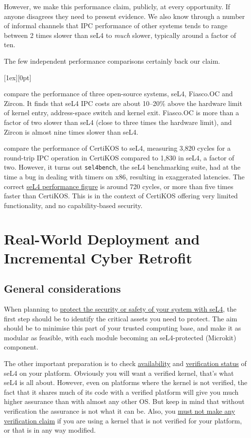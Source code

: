 \documentclass[english,a4paper,12pt]{report}
\newcommand{\Sect}[1]{\section{#1}}
\newcommand{\SSect}[1]{\subsection{#1}}
\newcommand{\Sect}[1]{\chapter{#1}}
\newcommand{\SSect}[1]{\section{#1}}
\newcommand{\code}[1]{\texttt{#1}}
\newlength{\chillilng}\setlength{\chillilng}{8mm}
\newlength{\chillimarg}\setlength{\chillimarg}{10mm}
\newcommand{\chilli}{\texttt{[image: chilli]}}
\newcommand{\chilliItem}{\raisebox{-5mm}[1ex][0pt]{%
      \makebox[\chillilng][r]{\chilli}}}
\newenvironment{Chilli}{
    \begin{list}{}{
      \setlength{\labelwidth}{\chillilng}
      \setlength{\leftmargin}{\chillimarg}}
    \item[\chilliItem]
    }
  {\end{list}}
\begin{document}
  However, we make this performance claim, publicly, at every
  opportunity. If anyone disagrees they need to present evidence. We
  also know through a number of informal channels that IPC performance
  of other systems tends to range between 2 times slower than seL4
  to \emph{much} slower, typically around a factor of ten.

  The few independent performance comparisons certainly back our claim.

  \begin{Chilli}
    \citet{Mi_LYWC_19} compare the performance of three open-source
    systems, seL4, Fiasco.OC and Zircon. It finds that seL4 IPC costs
    are about 10--20\% above the hardware limit of kernel entry,
    address-space switch and kernel exit. Fiasco.OC is more than a factor
    of two slower than seL4 (close to three times the hardware limit),
    and Zircon is almost nine times slower than seL4.

    \citet{Gu_SCWKSC_16} compare the performance of CertiKOS to seL4,
    measuring 3,820 cycles for a round-trip IPC operation in CertiKOS
    compared to 1,830 in seL4, a factor of two. However, it turns out
    \code{sel4bench}, the seL4 benchmarking suite, had at the time a
    bug in dealing with timers on x86, resulting in exaggerated
    latencies. The correct
    \href{https://sel4.systems/About/Performance/}{seL4 performance
      figure} is around 720 cycles, or more than five times faster
    than CertiKOS. This is in the context of CertiKOS offering very
    limited functionality, and no capability-based security.
  \end{Chilli}

  \Sect{Real-World Deployment and Incremental Cyber
    Retrofit}\label{s:retrofit}

  \SSect{General considerations}

  When planning to \href{https://sel4.systems/Use/}{protect the
    security or safety of your system with seL4}, the first step
  should be to identify the critical assets you need to protect. The
  aim should be to minimise this part of your trusted computing base,
  and make it as modular as feasible, with each module becoming an
  seL4-protected (Microkit) component.

  The other important preparation is to check
  \href{https://docs.sel4.systems/Hardware/}{availability}  and
  \href{https://docs.sel4.systems/projects/sel4/verified-configurations.html}{verification
    status} of seL4 on your platform. Obviously you will want a
  verified kernel, that's what seL4 is all about. However, even on
  platforms where the kernel is not verified, the fact that it shares
  much of its code with a verified platform will give you much higher
  assurance than with almost any other OS. But keep in mind that
  without verification the assurance is not what it can be. Also, you
  \href{https://sel4.systems/Foundation/Trademark/}{must not make any verification claim} if you are using a kernel
  that is not verified for your platform, or that is in any way
  modified.
\end{document}
